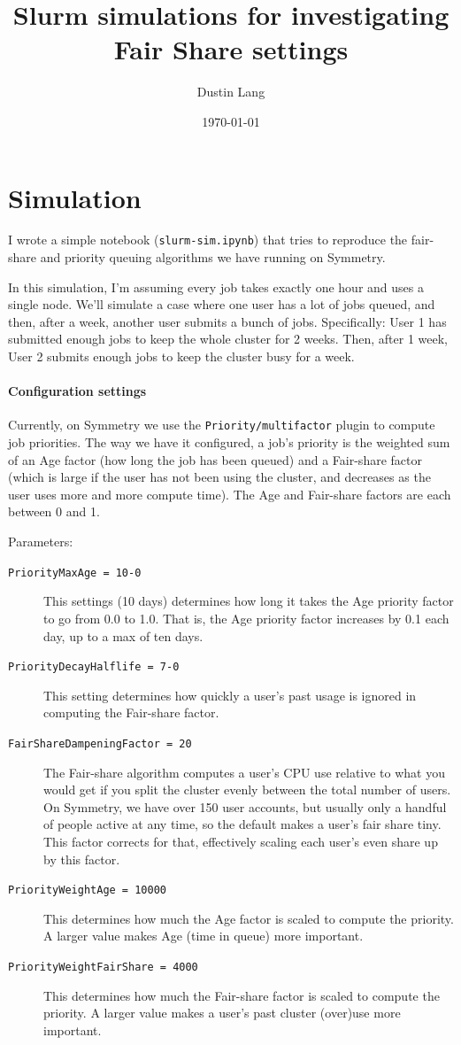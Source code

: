 \documentclass{article}
\title{Slurm simulations for investigating Fair Share settings}
\author{Dustin Lang}
\date{\today}
\newcommand{\code}[1]{\texttt{#1}}
\begin{document}
\maketitle

\section{Simulation}

I wrote a simple notebook (\code{slurm-sim.ipynb}) that tries to reproduce the fair-share and priority queuing
algorithms we have running on Symmetry.

In this simulation, I'm assuming every job takes exactly one hour and
uses a single node.  We'll simulate a case where one user has a lot of
jobs queued, and then, after a week, another user submits a bunch of
jobs.  Specifically: User 1 has submitted enough jobs to keep the
whole cluster for 2 weeks.  Then, after 1 week, User 2 submits enough
jobs to keep the cluster busy for a week.

\paragraph{Configuration settings}
Currently, on Symmetry we use the \code{Priority/multifactor} plugin
to compute job priorities.  The way we have it configured, a job's
priority is the weighted sum of an Age factor (how long the job has
been queued) and a Fair-share factor (which is large if the user has
not been using the cluster, and decreases as the user uses more and
more compute time).  The Age and Fair-share factors are each between 0
and 1.

Parameters:
\begin{description}
  \item[\code{PriorityMaxAge = 10-0}] This settings (10 days)
    determines how long it takes the Age priority factor to go from
    0.0 to 1.0.  That is, the Age priority factor increases by 0.1
    each day, up to a max of ten days.
  \item[\code{PriorityDecayHalflife = 7-0}] This setting determines
    how quickly a user's past usage is ignored in computing the
    Fair-share factor.
  \item[\code{FairShareDampeningFactor = 20}] The Fair-share
    algorithm computes a user's CPU use relative to what you would
    get if you split the cluster evenly between the total number of
    users.  On Symmetry, we have over 150 user accounts, but usually
    only a handful of people active at any time, so the default
    makes a user's fair share tiny.  This factor corrects for that,
    effectively scaling each user's even share up by this factor.
  \item[\code{PriorityWeightAge = 10000}] This determines how much the
    Age factor is scaled to compute the priority.  A larger value
    makes Age (time in queue) more important.
  \item[\code{PriorityWeightFairShare = 4000}] This determines how
    much the Fair-share factor is scaled to compute the priority.  A
    larger value makes a user's past cluster (over)use more important.
\end{description}
\end{document}

